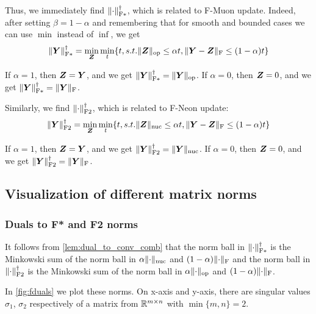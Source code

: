 \documentclass{article} %
\newcommand{\Rmn}{\R^{m\times n}}
\DeclarePairedDelimiter{\normf}{\|}{\|_\mathrm{F}}
\DeclarePairedDelimiter{\normfstar}{\|}{\|_\mathrm{F*}}
\DeclarePairedDelimiter{\normftwo}{\|}{\|_\mathrm{F2}}
\DeclarePairedDelimiter{\norms}{\|}{\|_{\mathrm{op}}}
\DeclarePairedDelimiter{\normn}{\|}{\|_{\mathrm{nuc}}}
\begin{document}
Thus, we immediately find $\normfstar{\cdot}^\dagger$, which is related to F-Muon update. Indeed, after setting $\beta=1-\alpha$ and remembering that for smooth and bounded cases we can use $\min$ instead of $\inf$, we get 
\begin{equation}\label{eq:normfstardual}
\normfstar{\mY}^\dagger = \min_{\mZ} \min_t\{t, s.t. \norms{\mZ}\leq \alpha t, \normf{\mY-\mZ}\leq (1-\alpha) t\}
\end{equation}

If $\alpha = 1$, then ${\bm{Z}} = {\bm{Y}}$, and we get $\normfstar{\mY}^\dagger = \norms{\mY}$. If $\alpha = 0$, then ${\bm{Z}} = 0$, and we get $\normfstar{\mY}^\dagger = \normf{\mY}$.

Similarly, we find $\normftwo{\cdot}^\dagger$, which is related to F-Neon update:
\begin{equation}\label{eq:normftwodual}
\normftwo{\mY}^\dagger = \min_{\mZ} \min_t\{t, s.t. \normn{\mZ}\leq \alpha t, \normf{\mY-\mZ}\leq (1-\alpha) t\}
\end{equation}

If $\alpha = 1$, then ${\bm{Z}} = {\bm{Y}}$, and we get $\normftwo{\mY}^\dagger = \normn{\mY}$. If $\alpha = 0$, then ${\bm{Z}} = 0$, and we get $\normftwo{\mY}^\dagger = \normf{\mY}$.


\subsection{Visualization of different matrix norms}
\subsubsection{Duals to F* and F2 norms}
    
 It follows from \ref{lem:dual_to_conv_comb} that the norm ball in $\normfstar{\cdot}^\dagger$ is the Minkowski sum of the norm ball in $\alpha\normn{\cdot}$ and $(1-\alpha)\normf{\cdot}$ and the norm ball in $\normftwo{\cdot}^\dagger$ is the Minkowski sum of the norm ball in $\alpha\norms{\cdot}$ and $(1-\alpha)\normf{\cdot}$.

In \ref{fig:fduals} we plot these norms. On x-axis and y-axis, there are singular values $\sigma_1$, $\sigma_2$ respectively of a matrix from $\Rmn$ with $\min\{m,n\}=2$.
\end{document}
